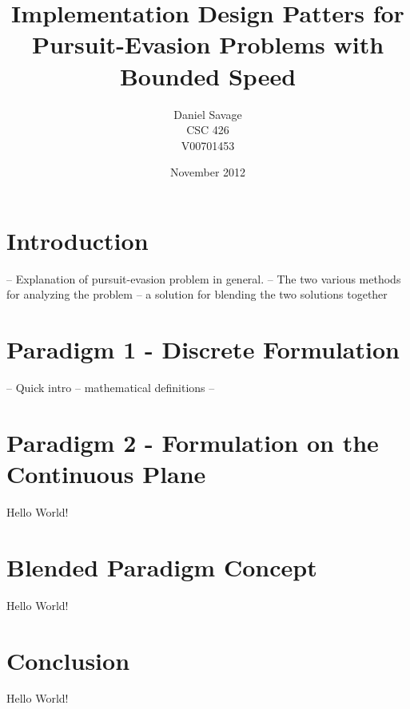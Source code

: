 \documentclass{article}
\begin{document}
\title{Implementation Design Patters for Pursuit-Evasion Problems with Bounded Speed}
\author{Daniel Savage\\CSC 426\\{V00701453}}
\date{November 2012}
\maketitle
\pagebreak

\section{Introduction}
-- Explanation of pursuit-evasion problem in general.
-- The two various methods for analyzing the problem
-- a solution for blending the two solutions together

\section{Paradigm 1 - Discrete Formulation}
-- Quick intro
-- mathematical definitions
-- 

\section{Paradigm 2 - Formulation on the Continuous Plane}
Hello World!

\section{Blended Paradigm Concept}
Hello World!

\section{Conclusion}
Hello World!
\end{document}
